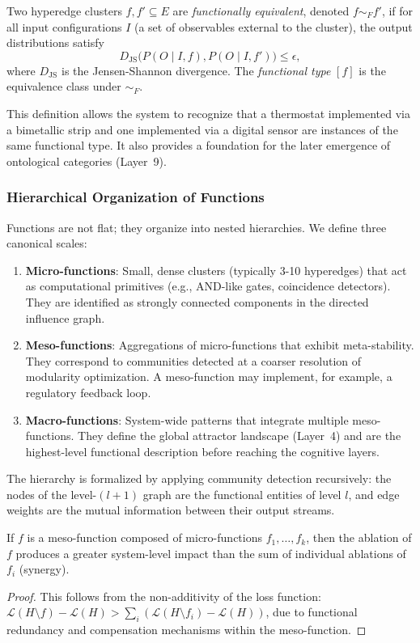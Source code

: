 \begin{definition}
Two hyperedge clusters $f, f' \subseteq E$ are \emph{functionally equivalent}, denoted $f \sim_F f'$, if for all input configurations $I$ (a set of observables external to the cluster), the output distributions satisfy
\[
D_{\text{JS}}\big( P(O \mid I, f), P(O \mid I, f') \big) \le \epsilon,
\]
where $D_{\text{JS}}$ is the Jensen-Shannon divergence. The \emph{functional type} $[f]$ is the equivalence class under $\sim_F$.
\end{definition}

This definition allows the system to recognize that a thermostat implemented via a bimetallic strip and one implemented via a digital sensor are instances of the same functional type. It also provides a foundation for the later emergence of ontological categories (Layer~9).

\subsubsection{Hierarchical Organization of Functions}
Functions are not flat; they organize into nested hierarchies. We define three canonical scales:
\begin{enumerate}
    \item \textbf{Micro-functions}: Small, dense clusters (typically 3-10 hyperedges) that act as computational primitives (e.g., AND-like gates, coincidence detectors). They are identified as strongly connected components in the directed influence graph.
    \item \textbf{Meso-functions}: Aggregations of micro-functions that exhibit meta-stability. They correspond to communities detected at a coarser resolution of modularity optimization. A meso-function may implement, for example, a regulatory feedback loop.
    \item \textbf{Macro-functions}: System-wide patterns that integrate multiple meso-functions. They define the global attractor landscape (Layer~4) and are the highest-level functional description before reaching the cognitive layers.
\end{enumerate}
The hierarchy is formalized by applying community detection recursively: the nodes of the level-$(l+1)$ graph are the functional entities of level $l$, and edge weights are the mutual information between their output streams.

\begin{proposition}
If $f$ is a meso-function composed of micro-functions $f_1, \dots, f_k$, then the ablation of $f$ produces a greater system-level impact than the sum of individual ablations of $f_i$ (synergy).
\end{proposition}
\begin{proof}
This follows from the non-additivity of the loss function: $\mathcal{L}(H \setminus f) - \mathcal{L}(H) > \sum_i (\mathcal{L}(H \setminus f_i) - \mathcal{L}(H))$, due to functional redundancy and compensation mechanisms within the meso-function.
\end{proof}

